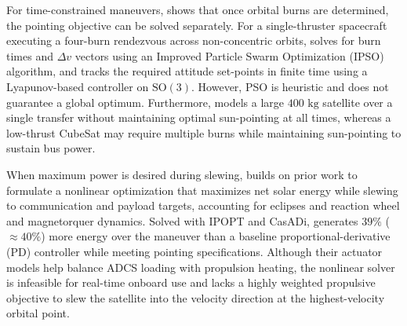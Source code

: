 For time-constrained maneuvers, \cite{zhangFinitetimeAttitudeSetpoint2020} shows that once orbital burns are determined, the pointing objective can be solved separately. For a single-thruster spacecraft executing a four-burn rendezvous across non-concentric orbits, \cite{zhangFinitetimeAttitudeSetpoint2020} solves for burn times and $\Delta v$ vectors using an Improved Particle Swarm Optimization (IPSO) algorithm, and tracks the required attitude set-points in finite time using a Lyapunov-based controller on $\text{SO}(3)$. However, PSO is heuristic and does not guarantee a global optimum. Furthermore, \cite{zhangFinitetimeAttitudeSetpoint2020} models a large $400\text{ kg}$ satellite over a single transfer without maintaining optimal sun-pointing at all times, whereas a low-thrust CubeSat may require multiple burns while maintaining sun-pointing to sustain bus power.

When maximum power is desired during slewing, \cite{kristiansenEnergyOptimalAttitude2024} builds on prior work to formulate a nonlinear optimization that maximizes net solar energy while slewing to communication and payload targets, accounting for eclipses and reaction wheel and magnetorquer dynamics. Solved with IPOPT and CasADi, \cite{kristiansenEnergyOptimalAttitude2024} generates $39\%$ ($\approx 40\%$) more energy over the maneuver than a baseline proportional-derivative (PD) controller while meeting pointing specifications. Although their actuator models help balance ADCS loading with propulsion heating, the nonlinear solver is infeasible for real-time onboard use and lacks a highly weighted propulsive objective to slew the satellite into the velocity direction at the highest-velocity orbital point.

